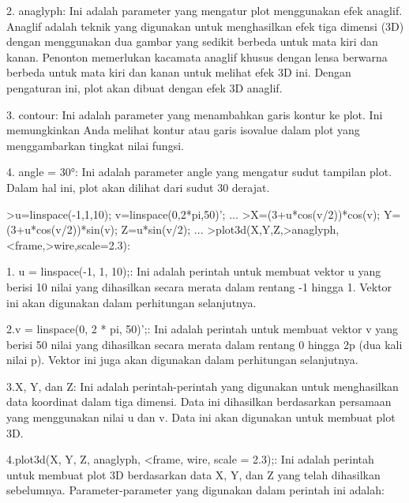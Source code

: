 \documentclass{article}
\begin{document}
\begin{eulernotebook}
\begin{eulercomment}
\begin{eulercomment}
\begin{eulercomment}
\begin{eulercomment}
\begin{eulercomment}
\begin{eulercomment}
\begin{eulercomment}
2. anaglyph: Ini adalah parameter yang mengatur plot menggunakan efek
anaglif. Anaglif adalah teknik yang digunakan untuk menghasilkan efek
tiga dimensi (3D) dengan menggunakan dua gambar yang sedikit berbeda
untuk mata kiri dan kanan. Penonton memerlukan kacamata anaglif khusus
dengan lensa berwarna berbeda untuk mata kiri dan kanan untuk melihat
efek 3D ini. Dengan pengaturan ini, plot akan dibuat dengan efek 3D
anaglif.

3. contour: Ini adalah parameter yang menambahkan garis kontur ke
plot. Ini memungkinkan Anda melihat kontur atau garis isovalue dalam
plot yang menggambarkan tingkat nilai fungsi.

4. angle = 30°: Ini adalah parameter angle yang mengatur sudut
tampilan plot. Dalam hal ini, plot akan dilihat dari sudut 30 derajat.
\end{eulercomment}
\begin{eulerprompt}
>u=linspace(-1,1,10); v=linspace(0,2*pi,50)'; ...
>X=(3+u*cos(v/2))*cos(v); Y=(3+u*cos(v/2))*sin(v); Z=u*sin(v/2); ...
>plot3d(X,Y,Z,>anaglyph,<frame,>wire,scale=2.3):
\end{eulerprompt}
\begin{eulercomment}
1. u = linspace(-1, 1, 10);: Ini adalah perintah untuk membuat vektor
u yang berisi 10 nilai yang dihasilkan secara merata dalam rentang -1
hingga 1. Vektor ini akan digunakan dalam perhitungan selanjutnya.

2.v = linspace(0, 2 * pi, 50)';: Ini adalah perintah untuk membuat
vektor v yang berisi 50 nilai yang dihasilkan secara merata dalam
rentang 0 hingga 2p (dua kali nilai p). Vektor ini juga akan digunakan
dalam perhitungan selanjutnya.

3.X, Y, dan Z: Ini adalah perintah-perintah yang digunakan untuk
menghasilkan data koordinat dalam tiga dimensi. Data ini dihasilkan
berdasarkan persamaan yang menggunakan nilai u dan v. Data ini akan
digunakan untuk membuat plot 3D.

4.plot3d(X, Y, Z, anaglyph, \textless{}frame, wire, scale = 2.3);: Ini adalah
perintah untuk membuat plot 3D berdasarkan data X, Y, dan Z yang telah
dihasilkan sebelumnya. Parameter-parameter yang digunakan dalam
perintah ini adalah:


\end{eulercomment}
\end{eulercomment}
\end{eulercomment}
\end{eulercomment}
\end{eulercomment}
\end{eulercomment}
\end{eulercomment}
\end{eulernotebook}
\end{document}
